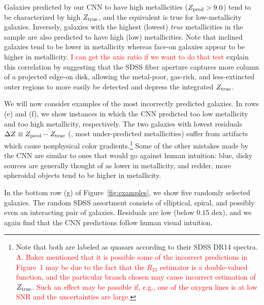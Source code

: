 \documentclass[fleqn,usenatbib]{mnras}
\newcommand{\editorial}[1]{\textcolor{red}{#1}}
\begin{document}
Galaxies predicted by our CNN to have high metallicities ($Z_{\rm pred} > 9.0$) tend to be characterized by high $Z_{\rm true}$, and the equivalent is true for low-metallicity galaxies. Inversely, galaxies with the highest (lowest) \textit{true} metallicities in the sample are also predicted to have high (low) metallicities. Note that inclined galaxies tend to be lower in metallicity whereas face-on galaxies appear to be higher in metallicity. \editorial{I can get the axis ratio if we want to do that test} \cite{Tremonti2004} explain this correlation by suggesting that the SDSS fiber aperture captures more column of a projected edge-on disk, allowing the metal-poor, gas-rich, and less-extincted outer regions to more easily be detected and depress the integrated $Z_{\rm true}$.

We will now consider examples of the most incorrectly predicted galaxies. In rows (e) and (f), we show instances in which the CNN predicted too low metallicity and too high metallicity, respectively. The two galaxies with lowest residuals $\Delta Z \equiv Z_{\rm pred} - Z_{\rm true}$ (\ie, most under-predicted metallicities) suffer from artifacts which cause nonphysical color gradients.\footnote{Note that both are labeled as quasars according to their SDSS DR14 spectra. \editorial{A. Baker mentioned that it is possible some of the incorrect predictions in Figure~1 may be due to the fact that the $R_{23}$ estimator is a double-valued function, and the particular branch chosen may cause incorrect estimation of $Z_{\rm true}$. Such an effect may be possible if, e.g., one of the oxygen lines is at low SNR and the uncertainties are large.}} Some of the other mistakes made by the CNN are similar to ones that would go against human intuition: blue, disky sources are generally thought of as lower in metallicity, and redder, more spheroidal objects tend to be higher in metallicity.

In the bottom row (g) of Figure~\ref{fig:examples}, we show five randomly selected galaxies. The random SDSS assortment consists of elliptical, spiral, and possibly even an interacting pair of galaxies. Residuals are low (below 0.15 dex), and we again find that the CNN predictions follow human visual intuition.
\end{document}
